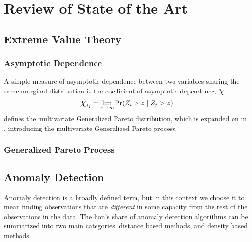 
\section{Review of State of the Art}
\subsection{Extreme Value Theory}
\subsubsection{Asymptotic Dependence}
A simple measure of asymptotic dependence between two variables sharing the same
  marginal distribution is the coefficient of asymptotic dependence, $\mbox{\Large$\chi$}$
\begin{equation}
    \mbox{\Large$\chi$}_{ij} = \lim_{z\rightarrow\infty}\text{Pr}(Z_i > z \mid Z_j > z)
\end{equation}
\cite{rootzen2006} defines the multivariate Generalized Pareto distribution,
which is expanded on in \cite{ferreira2014}, introducing the multivariate
Generalized Pareto process.



\subsubsection{Generalized Pareto Process}






\subsection{Anomaly Detection}
Anomaly detection is a broadly defined term, but in this context we choose it to
  mean finding observations that are \emph{different} in some capacity from the
  rest of the observations in the data.  The lion's share of anomaly detection
  algorithms can be summarized into two main categories: distance based methods,
  and density based methods.

